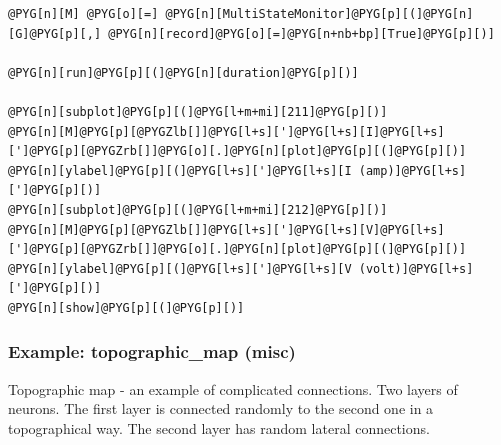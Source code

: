 \documentclass[letterpaper,10pt,english]{manual}
\begin{document}
\begin{Verbatim}[commandchars=@\[\]]
@PYG[n][M] @PYG[o][=] @PYG[n][MultiStateMonitor]@PYG[p][(]@PYG[n][G]@PYG[p][,] @PYG[n][record]@PYG[o][=]@PYG[n+nb+bp][True]@PYG[p][)]

@PYG[n][run]@PYG[p][(]@PYG[n][duration]@PYG[p][)]

@PYG[n][subplot]@PYG[p][(]@PYG[l+m+mi][211]@PYG[p][)]
@PYG[n][M]@PYG[p][@PYGZlb[]]@PYG[l+s][']@PYG[l+s][I]@PYG[l+s][']@PYG[p][@PYGZrb[]]@PYG[o][.]@PYG[n][plot]@PYG[p][(]@PYG[p][)]
@PYG[n][ylabel]@PYG[p][(]@PYG[l+s][']@PYG[l+s][I (amp)]@PYG[l+s][']@PYG[p][)]
@PYG[n][subplot]@PYG[p][(]@PYG[l+m+mi][212]@PYG[p][)]
@PYG[n][M]@PYG[p][@PYGZlb[]]@PYG[l+s][']@PYG[l+s][V]@PYG[l+s][']@PYG[p][@PYGZrb[]]@PYG[o][.]@PYG[n][plot]@PYG[p][(]@PYG[p][)]
@PYG[n][ylabel]@PYG[p][(]@PYG[l+s][']@PYG[l+s][V (volt)]@PYG[l+s][']@PYG[p][)]
@PYG[n][show]@PYG[p][(]@PYG[p][)]
\end{Verbatim}

\resetcurrentobjects
\hypertarget{--doc-examples-misc_topographic_map}{}

\hypertarget{index-70}{}\subsubsection{Example: topographic\_map (misc)}

Topographic map - an example of complicated connections.
Two layers of neurons.
The first layer is connected randomly to the second one in a
topographical way.
The second layer has random lateral connections.
\end{document}
